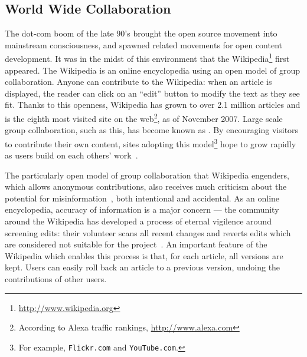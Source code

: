 \subsection{World Wide Collaboration}

The dot-com boom of the late 90's brought the open source movement into
mainstream consciousness, and spawned related movements for open
content development.
It was in the midst of this environment that the
Wikipedia\footnote{\url{http://www.wikipedia.org}}
first appeared.
The Wikipedia
is an online encyclopedia using an open model of group collaboration.
Anyone can contribute to the Wikipedia: when an article is
displayed, the reader can click on an ``edit'' button to modify
the text as they see fit.
Thanks to this openness, Wikipedia has grown to
over 2.1 million articles and is
the eighth most visited site on the
web\footnote{According to Alexa traffic rankings, \url{http://www.alexa.com}},
as of November 2007.
Large scale group collaboration, such as this,
has become known as . 
By encouraging visitors to contribute their own content,
sites adopting this model\footnote{For example,
\texttt{Flickr.com} and \texttt{YouTube.com}.}
hope to grow rapidly as users build on each others' work~\cite{Taylor2007}.



The particularly open model of group collaboration that Wikipedia engenders,
which allows anonymous contributions,
also receives much criticism about the potential for
misinformation~\cite{Seigenthaler05,Stross2006,NewYorkTimes05a,TheSun06,NewZelandHerald06,BBC06,NewYorkTimes06,TheNewYorker06,BBC07},
both intentional and accidental.
As an online encyclopedia, accuracy of information is a major concern ---
the community around the Wikipedia has developed a process
of eternal vigilence around screening edits: their volunteer  scans
all recent changes and reverts edits which are considered not
suitable for the project~\cite{wiki:RCPatrol}.
An important feature of the Wikipedia which enables this
process is that, for each article,
all versions are kept.
Users can easily roll back an article to a previous version,
undoing the contributions of other users.

